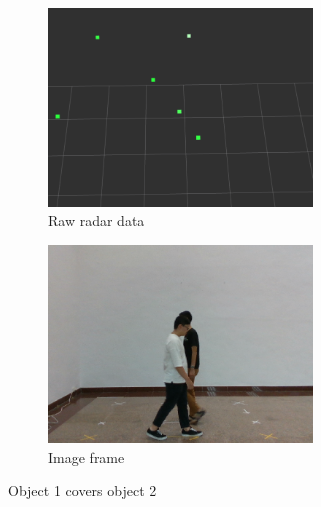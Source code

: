 \begin{figure}[!htb]
    \centering
    \begin{subfigure}{0.3\linewidth}
        \includegraphics[width=7cm]{Figures/concealing_radar.png}
        \caption{Raw radar data}
        \label{subfig:concealing_radar_fig}
    \end{subfigure}
    \hspace{0.15\textwidth}
    \begin{subfigure}{0.3\linewidth}
        \includegraphics[width=7cm]{Figures/concealing_image.png}
        \caption{Image frame}
        \label{subfig:concealing_image_fig}
    \end{subfigure}

    \caption{Object 1 covers object 2}
    \label{fig:concealing_fig}
\end{figure}

